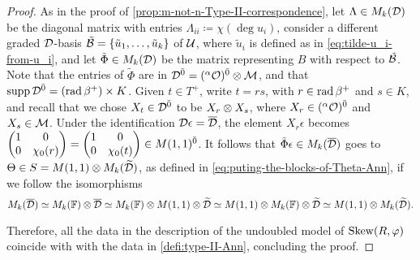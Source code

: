 \begin{proof}
    As in the proof of \cref{prop:m-not-n-Type-II-correspondence}, let $\Lambda \in M_k(\mathcal{D})$ be the diagonal matrix with entries $\Lambda_{ii} \coloneqq \chi(\deg u_i)$, consider a different graded $\mathcal{D}$-basis $\tilde {\mathcal B} = \{ \tilde u_1, \ldots, \tilde u_k \}$ of $\mathcal U$, where $\tilde u_i$ is defined as in \cref{eq:tilde-u_i-from-u_i}, and let $\tilde \Phi \in M_k(\mathcal{D})$ be the matrix representing $B$ with respect to $\tilde {\mathcal B}$. 
    Note that the entries of $\tilde\Phi$ are in $\mathcal{D}^{\bar0} = \mathcal ({}^\alpha\mathcal O)^{\bar0} \otimes \mathcal M$, and that $\operatorname{supp} \mathcal{D}^{\bar0} = (\operatorname{rad} \beta^+) \times K$. 
    Given $t \in T^+$, write $t= rs$, with $r\in \operatorname{rad} \beta^+$ and $s\in K$, and recall that we chose $X_t \in \mathcal{D}^{\bar0}$ to be $X_r \otimes X_s$, where $X_r \in ({}^\alpha\mathcal O)^{\bar0}$ and $X_s \in \mathcal M$. 
    Under the identification $\D\epsilon = \barr \D$, the element $X_r\epsilon$ becomes $
    \begin{pmatrix}
        1 & 0\\
        0 & \chi_0(r)
    \end{pmatrix} = 
    \begin{pmatrix}
        1 & 0\\
        0 & \chi_0(t)
    \end{pmatrix} \in M(1,1)^{\bar0}$. 
    It follows that $\tilde \Phi \epsilon \in M_k(\barr \D)$ goes to $\Theta \in S = M(1,1)\otimes M_k(\widetilde {\mathcal{D}})$, as defined in \cref{eq:puting-the-blocks-of-Theta-Ann}, if we follow the isomorphisms
    \[\label{eq:chain-of-isos-Ann}
        M_k(\barr \D) \iso
        M_k(\FF)\tensor \barr \D \iso
        M_k(\FF) \tensor M(1,1) \tensor \widetilde \D \iso
        M(1,1) \tensor M_k(\FF) \tensor \widetilde \D \iso
        M(1,1)\tensor M_k(\widetilde \D). 
    \]
    
    Therefore, all the data in the description of the undoubled model of $\operatorname{Skew}(R, \varphi)$ coincide with with the data in \cref{defi:type-II-Ann}, concluding the proof.
\end{proof}



